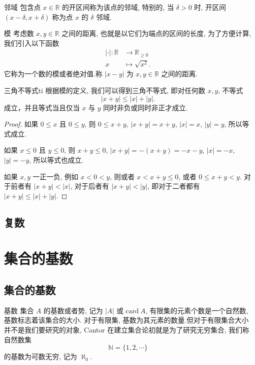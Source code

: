 \documentclass[cn,toc=twocol]{elegantbook}
\newcommand{\R}{\mathbb{R}}
\begin{document}
\begin{definition}{邻域}
包含点 $x \in \R$ 的开区间称为该点的邻域, 特别的, 当 $\delta > 0$ 时, 开区间 $(x - \delta, x+\delta)$ 称为点 $x$ 的 $\delta$ 邻域.
\end{definition}

\begin{definition}{模}
考虑数 $x, y\in\R$ 之间的距离, 也就是以它们为端点的区间的长度, 为了方便计算, 我们引入以下函数
\[
\begin{aligned}
	|\cdot|:\R &\to \R_{\ge 0}\\
	x &\mapsto \sqrt{x^2}.
\end{aligned}
\]
它称为一个数的模或者绝对值.称 $\lvert x - y\rvert$ 为 $x, y\in\R$ 之间的距离.
\end{definition}

\begin{theorem}{三角不等式}{ti}
根据模的定义, 我们可以得到三角不等式, 即对任何数 $x,y$, 不等式
\[
	\lvert x+y\rvert \le \lvert x\rvert + \lvert y\rvert.
\]
成立，并且等式当且仅当 $x$ 与 $y$ 同时非负或同时非正才成立.
\end{theorem}
\begin{proof}
如果 $0\le x$ 且 $0\le y$, 则 $0\le x+y$, $\lvert x+y\rvert = x+y$, $\lvert x \rvert = x$, $\lvert y \rvert = y$, 所以等式成立.

如果 $x \le 0$ 且 $y\le 0$, 则 $x+y \le 0$, $\lvert x+y\rvert = -(x+y) = -x-y$, $\lvert x \rvert = -x$, $\lvert y \rvert = -y$, 所以等式也成立.

如果 $x,y$ 一正一负, 例如 $x < 0 < y$, 则或者 $x < x+y \le 0$, 或者 $0 \le x+y <y$. 对于前者有 $\lvert x + y\rvert < \lvert x \rvert$, 对于后者有 $\lvert x + y\rvert < \lvert y \rvert$, 即对于二者都有 $\lvert x+y\rvert \le \lvert x\rvert + \lvert y\rvert$.
\end{proof}
\smallskip


\subsection{复数}




\section{集合的基数}

\subsection{集合的基数}
\begin{definition}{基数}
集合 $A$ 的基数或者势, 记为 $|A|$ 或 $\mathrm{card}\ A$, 有限集的元素个数是一个自然数, 基数标志着该集合的大小. 对于有限集, 基数为其元素的数量.但对于有限集合大小并不是我们要研究的对象, Cantor 在建立集合论初就是为了研究无穷集合, 我们称自然数集
\[
	\mathbb{N}=\{1, 2, \cdots\}
\]
的基数为可数无穷, 记为 $\aleph_0$.
\end{definition}
\end{document}
